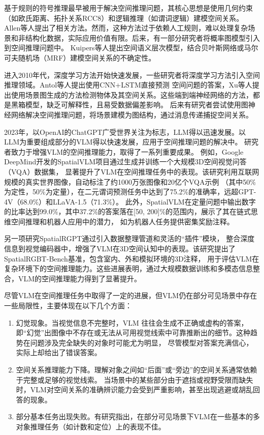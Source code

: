 基于规则的符号推理最早被用于解决空间推理问题，其核心思想是使用几何约束（如欧氏距离、拓扑关系RCC8）和逻辑推理（如谓词逻辑）建模空间关系。
Allen等人提出了相关方法。然而，这种方法过于依赖人工规则，难以处理复杂场景和非结构化数据，实际应用价值有限。后来，有一部分研究者将概率图模型引入到空间推理问题中。
Kuipers等人提出空间语义层次模型，结合贝叶斯网络或马尔可夫随机场（MRF）建模空间关系的不确定性。

进入2010年代，深度学习方法开始快速发展，一些研究者将深度学习方法引入空间推理领域。Antol等人\cite{Antol2015VQA}提出使用CNN+LSTM直接预测
空间问题的答案，Xu等人\cite{xu2017scene}提出使用场景图生成的方法检测物体及其空间关系。这些端到端神经网络的方法，都是黑箱模型，缺乏可解释性，且易受数据偏差影响。
后来有研究者尝试使用图神经网络解决空间推理问题，将场景建模为图结构，通过消息传递捕捉空间关系。

2023年，以OpenAI的ChatGPT广受世界关注为标志，LLM得以迅速发展。以LLM为重要组成部分的VLM得以快速发展，应用于空间推理问题的解决中。
研究者致力于增强VLM的空间推理能力，取得了一系列重要成果。
例如，Google DeepMind开发的SpatialVLM\cite{chen2024spatialvlmendowingvisionlanguagemodels}项目通过生成并训练一个大规模3D空间视觉问答（VQA）数据集，
显著提升了VLM在空间推理任务中的表现。该研究利用互联网规模的真实世界图像，自动标注了约1000万张图像和20亿个VQA示例
（其中50\%为定性，50\%为定量），在二元谓词预测任务中达到了75.2\%的准确率，远超GPT-4V（68.0\%）和LLaVA-1.5（71.3\%）。
此外，SpatialVLM在定量问题中输出数字的比率达到99.0\%，其中37.2\%的答案落在[50, 200]\%的范围内，展示了其在链式思维空间推理和机器人应用中的潜力，
如为机器人任务提供密集奖励注释。

另一项研究SpatialRGPT\cite{cheng2024spatialrgptgroundedspatialreasoning}通过引入数据整理管道和灵活的“插件”模块，
整合深度信息到视觉编码器中，增强了VLM在3D空间认知中的表现。该研究提出了SpatialRGBT-Bench基准，包含室内、外和模拟环境的3D注释，
用于评估VLM在复杂环境下的空间推理能力。这些进展表明，通过大规模数据训练和多模态信息整合，VLM的空间推理能力得到了显著提升。

尽管VLM在空间推理任务中取得了一定的进展，但VLM仍在部分可见场景中存在一些局限性，主要体现在以下几个方面：
\begin{enumerate}[itemsep=0pt,parsep=0pt]
\item 幻觉现象。当视觉信息不完整时，VLM 往往会生成不正确或虚构的答案，
即“幻觉”出图像中不存在或无法从可用视觉线索中可靠推断出的细节。这种趋势在问题涉及完全缺失的对象时可能尤为明显，
尽管模型对答案充满信心，实际上却给出了错误答案\cite{vardi2025clipupclipbasedunanswerableproblem}。
\item 空间关系推理能力下降。理解对象之间如“后面”或“旁边”的空间关系通常依赖于完整或足够的视觉线索。
当场景中的某些部分由于遮挡或视野受限而缺失时，VLM对空间关系的准确辨识能力会受到严重影响，甚至出现逃避或胡乱回答的现象\cite{chen2024spatialvlmendowingvisionlanguagemodels}。
\item 部分基本任务出现失败。有研究指出，在部分可见场景下VLM在一些基本的多对象推理任务（如计数和定位）上的表现不佳\cite{campbell2024understandinglimitsvisionlanguage}。
\end{enumerate}

